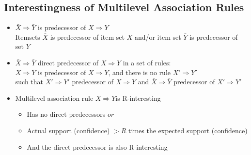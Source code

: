 \documentclass[../notes.tex]{subfiles}
\begin{document}
\subsection{Interestingness of Multilevel Association Rules}
\begin{itemize}
  \item $\bar{X} \Rightarrow \bar{Y}$ is predecessor of $X \Rightarrow Y$ \\ 
  Itemsets $\bar{X}$ is predecessor of item set $X$ and/or item set $\bar{Y}$ is predecessor of set $Y$

  \item $\bar{X} \Rightarrow \bar{Y}$ direct predecessor of $X \Rightarrow Y$ in a set of rules: \\
  $\bar{X} \Rightarrow \bar{Y}$ is predecessor of $X \Rightarrow Y$, and there is no rule $X' \Rightarrow Y'$ \\
  such that $X' \Rightarrow Y'$ predecessor of $X \Rightarrow Y$ and $\bar{X} \Rightarrow \bar{Y}$ predecessor of $X' \Rightarrow Y'$

  \item Multilevel association rule $X \Rightarrow Y$is R-interesting
  \begin{itemize} 
    \item Has no direct predecessors $or$
    \item Actual support (confidence) $ > R$ times the expected support (confidence)
    \item And the direct predecessor is also R-interesting
  \end{itemize}

\end{itemize}
\end{document}
